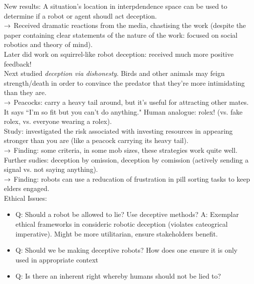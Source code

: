New results: A situation's location in interpdendence space can be used to determine if a robot or agent shoudl act deception. \\

$\rightarrow$ Received dramatic reactions from the media, chastising the work (despite the paper containing clear statements of the nature of the work: focused on social robotics and theory of mind). \\

Later did work on squirrel-like robot deception: received much more positive feedback! \\

Next studied {\it deception via dishonesty}. Birds and other animals may feign strength/death in order to convince the predator that they're more intimidating than they are. \\

$\rightarrow$ Peacocks: carry a heavy tail around, but it's useful for attracting other mates. It says ``I'm so fit but you can't do anything." Human analogue: rolex! (vs. fake rolex, vs. everyone wearing a rolex). \\

Study: investigated the risk associated with investing resources in appearing stronger than you are (like a peacock carrying its heavy tail). \\

$\rightarrow$ Finding: some criteria, in some mob sizes, these strategies work quite well.\\

Further sudies: deception by omission, deception by comission (actively sending a signal vs. not saying anything). \\

$\rightarrow$ Finding: robots can use a reducation of frustration in pill sorting tasks to keep elders engaged. \\

Ethical Issues:
\begin{itemize}
\item Q: Should a robot be allowed to lie? Use deceptive methods?
A: Exemplar ethical frameworks in consideric robotic deception (violates cateogrical imperative). Might be more utilitarian, ensure stakeholders benefit.

\item Q: Should we be making deceptive robots? How does one ensure it is only used in appropriate context
\item Q: Is there an inherent right whereby humans should not be lied to?
\end{itemize}


